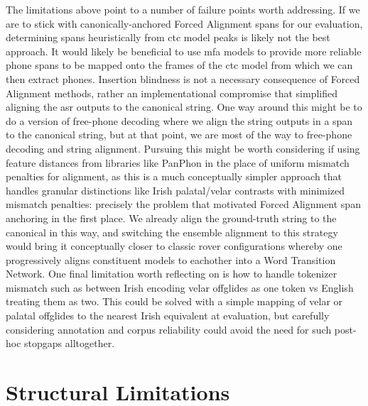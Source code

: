 \documentclass[thesis]{cluu}
\begin{document}
The limitations above point to a number of failure points worth addressing. If we are to stick with canonically-anchored Forced Alignment spans for our evaluation, determining spans heuristically from \gls{ctc} model peaks is likely not the best approach. It would likely be beneficial to use \gls{mfa} models to provide more reliable phone spans to be mapped onto the frames of the \gls{ctc} model from which we can then extract phones. Insertion blindness is not a necessary consequence of Forced Alignment methods, rather an implementational compromise that simplified aligning the \gls{asr} outputs to the canonical string. One way around this might be to do a version of free-phone decoding where we align the string outputs in a span to the canonical string, but at that point, we are most of the way to free-phone decoding and string alignment. Pursuing this might be worth considering if using feature distances from libraries like PanPhon in the place of uniform mismatch penalties for alignment, as this is a much conceptually simpler approach that handles granular distinctions like Irish palatal/velar contrasts with minimized mismatch penalties: precisely the problem that motivated Forced Alignment span anchoring in the first place. We already align the ground-truth string to the canonical in this way, and switching the ensemble alignment to this strategy would bring it conceptually closer to classic \gls{rover} configurations whereby one progressively aligns constituent models to eachother into a Word Transition Network. One final limitation worth reflecting on is how to handle tokenizer mismatch such as between Irish encoding velar offglides as one token vs English treating them as two. This could be solved with a simple mapping of velar or palatal offglides to the nearest Irish equivalent at evaluation, but carefully considering annotation and corpus reliability could avoid the need for such post-hoc stopgaps alltogether.
\section{Structural Limitations}
\end{document}
